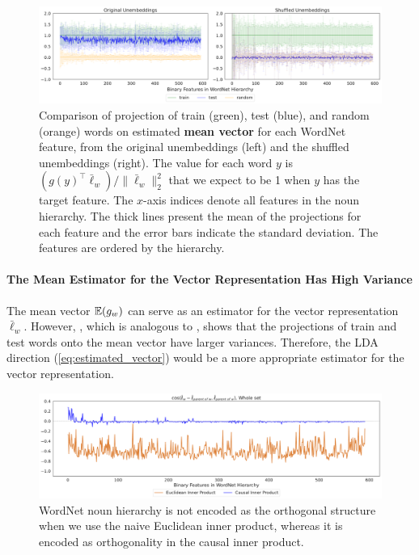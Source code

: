 \documentclass{article}
\begin{document}
\begin{figure}[t]
  \centering
  \includegraphics[width=1.0\linewidth]{figures/eval_mean_noun_gemma.pdf}
  \caption{
  Comparison of projection of train (green), test (blue), and random (orange) words on estimated \textbf{mean vector} for each WordNet feature, from the original unembeddings (left) and the shuffled unembeddings (right).
  The value for each word $y$ is $(g(y)^{\top}\bar\ell_w)/\|\bar\ell_w\|_2^2$ that we expect to be 1 when $y$ has the target feature. The $x$-axis indices denote all features in the noun hierarchy.
  The thick lines present the mean of the projections for each feature and the error bars indicate the standard deviation.
  The features are ordered by the hierarchy.}
  \label{fig:eval_mean_noun_gemma}
\end{figure}

\paragraph*{The Mean Estimator for the Vector Representation Has High Variance}
The mean vector $\mathbb{E}(g_w)$ can serve as an estimator for the vector representation $\bar\ell_w$.
However, , which is analogous to , shows that the projections of train and test words onto the mean vector have larger variances.
Therefore, the LDA direction (\cref{eq:estimated_vector}) would be a more appropriate estimator for the vector representation.


\begin{figure}[t]
  \centering
  \includegraphics[width=1.0\linewidth]{figures/hier_ortho_b_noun_gemma_gamma.pdf}
  \caption{WordNet noun hierarchy is not encoded as the orthogonal structure when we use the naive Euclidean inner product, whereas it is encoded as orthogonality in the causal inner product.
  }
  \label{fig:hier_ortho_b_noun_gemma_gamma}
\end{figure}
\end{document}
